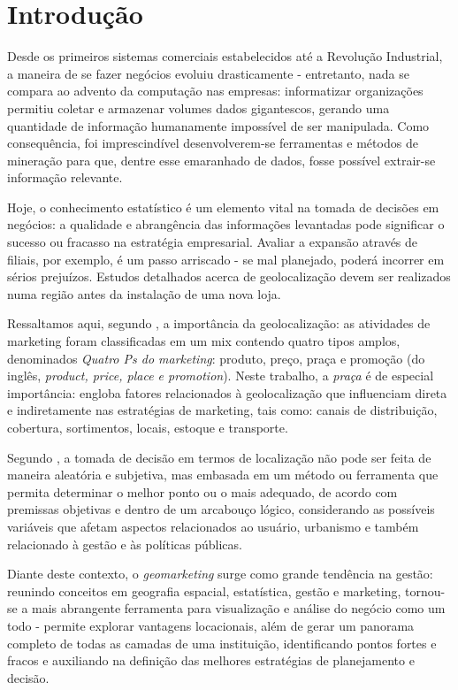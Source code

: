 ﻿
\chapter{Introdução}
\label{introducao}

Desde os primeiros sistemas comerciais estabelecidos até a Revolução Industrial,
a maneira de se fazer negócios evoluiu drasticamente - entretanto, nada se
compara ao advento da computação nas empresas: informatizar
organizações permitiu coletar e armazenar volumes dados
gigantescos, gerando uma quantidade de informação humanamente impossível de
ser manipulada. Como consequência, foi imprescindível desenvolverem-se ferramentas e
métodos de mineração para que, dentre esse emaranhado de dados, fosse possível extrair-se informação relevante. 

Hoje, o conhecimento estatístico é um elemento vital na tomada de decisões em negócios: a qualidade e abrangência das informações levantadas pode significar o sucesso ou fracasso na estratégia empresarial. Avaliar a expansão através de filiais, por exemplo, é um passo arriscado - se mal planejado, poderá incorrer em sérios prejuízos. Estudos detalhados acerca de geolocalização devem ser realizados numa região antes da instalação de uma nova loja. 

Ressaltamos aqui, segundo , a importância da geolocalização: as atividades de marketing foram classificadas em um mix contendo quatro tipos amplos, denominados \emph{Quatro Ps do marketing}: produto, preço, praça e promoção (do inglês, \emph{product, price, place e promotion}). Neste trabalho, a \emph{praça} é de especial importância: engloba fatores relacionados à geolocalização que influenciam direta e indiretamente nas estratégias de marketing, tais como: canais de distribuição, cobertura, sortimentos, locais, estoque e transporte. 

Segundo , a tomada de decisão em termos de
localização não pode ser feita de maneira aleatória e subjetiva, mas embasada em
um método ou ferramenta que permita determinar o melhor ponto ou o mais
adequado, de acordo com premissas objetivas e dentro de um arcabouço lógico,
considerando as possíveis variáveis que afetam aspectos relacionados ao usuário,
urbanismo e também relacionado à gestão e às políticas públicas. 

Diante deste contexto, o \emph{geomarketing} surge como grande tendência na gestão: reunindo conceitos em geografia espacial, estatística, gestão e marketing, tornou-se a mais abrangente ferramenta para visualização e análise do negócio como um todo - permite explorar vantagens locacionais, além de gerar um panorama completo de todas as camadas de uma instituição, identificando pontos fortes e fracos e auxiliando na definição das melhores estratégias de planejamento e decisão.

